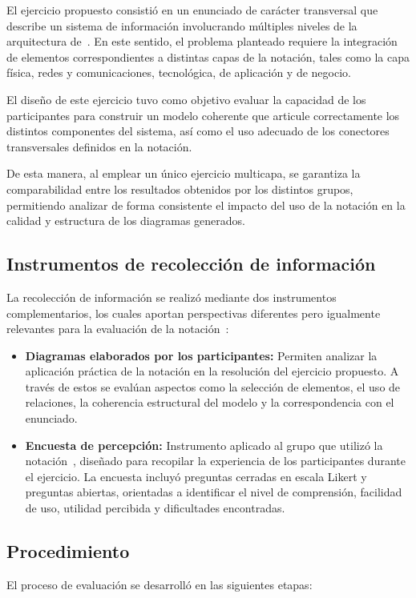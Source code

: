 El ejercicio propuesto consistió en un enunciado de carácter transversal que describe un sistema de información involucrando múltiples niveles de la arquitectura de~\TI. En este sentido, el problema planteado requiere la integración de elementos correspondientes a distintas capas de la notación, tales como la capa física, redes y comunicaciones, tecnológica, de aplicación y de negocio.

El diseño de este ejercicio tuvo como objetivo evaluar la capacidad de los participantes para construir un modelo coherente que articule correctamente los distintos componentes del sistema, así como el uso adecuado de los conectores transversales definidos en la notación.

De esta manera, al emplear un único ejercicio multicapa, se garantiza la comparabilidad entre los resultados obtenidos por los distintos grupos, permitiendo analizar de forma consistente el impacto del uso de la notación en la calidad y estructura de los diagramas generados.

\subsection{Instrumentos de recolección de información}
\noindent
La recolección de información se realizó mediante dos instrumentos complementarios, los cuales aportan perspectivas diferentes pero igualmente relevantes para la evaluación de la notación~\NDITI:

\begin{itemize}
\item \textbf{Diagramas elaborados por los participantes:} Permiten analizar la aplicación práctica de la notación en la resolución del ejercicio propuesto. A través de estos se evalúan aspectos como la selección de elementos, el uso de relaciones, la coherencia estructural del modelo y la correspondencia con el enunciado.

\item \textbf{Encuesta de percepción:} Instrumento aplicado al grupo que utilizó la notación~\NDITI{}, diseñado para recopilar la experiencia de los participantes durante el ejercicio. La encuesta incluyó preguntas cerradas en escala Likert y preguntas abiertas, orientadas a identificar el nivel de comprensión, facilidad de uso, utilidad percibida y dificultades encontradas.
\end{itemize}

\subsection{Procedimiento}
\noindent
El proceso de evaluación se desarrolló en las siguientes etapas:


